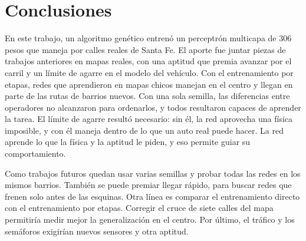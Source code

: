 \documentclass[final]{article}
\begin{document}
\section{Conclusiones}
\label{sec:conclusiones}

En este trabajo, un algoritmo genético entrenó un perceptrón multicapa de 306 pesos que maneja por calles reales de Santa Fe.
El aporte fue juntar piezas de trabajos anteriores en mapas reales, con una aptitud que premia avanzar por el carril y un límite de agarre en el modelo del vehículo.
Con el entrenamiento por etapas, redes que aprendieron en mapas chicos manejan en el centro y llegan en parte de las rutas de barrios nuevos.
Con una sola semilla, las diferencias entre operadores no alcanzaron para ordenarlos, y todos resultaron capaces de aprender la tarea.
El límite de agarre resultó necesario: sin él, la red aprovecha una física imposible, y con él maneja dentro de lo que un auto real puede hacer.
La red aprende lo que la física y la aptitud le piden, y eso permite guiar su comportamiento.

Como trabajos futuros quedan usar varias semillas y probar todas las redes en los mismos barrios.
También se puede premiar llegar rápido, para buscar redes que frenen solo antes de las esquinas.
Otra línea es comparar el entrenamiento directo con el entrenamiento por etapas.
Corregir el cruce de siete calles del mapa permitiría medir mejor la generalización en el centro.
Por último, el tráfico y los semáforos exigirían nuevos sensores y otra aptitud.

{\small
\setlength{\bibsep}{1pt}

}
\end{document}

